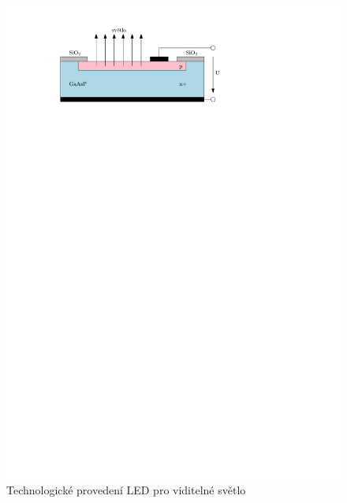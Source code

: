 \begin{figure}[H]
    \begin{center}
        \includegraphics[scale=1]{img/led}
    \end{center}
    \caption{Technologické provedení LED pro viditelné světlo}
\end{figure}

